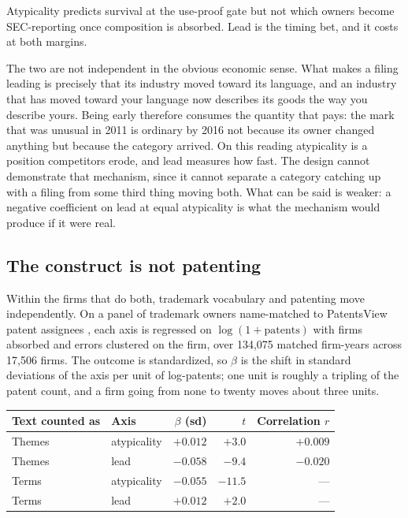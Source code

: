 \documentclass[11pt]{article}
\begin{document}
Atypicality predicts survival at the use-proof gate but not which owners become SEC-reporting once composition is
absorbed. Lead is the timing bet, and it costs at both margins.

The two are not independent in the obvious economic sense. What makes a
filing leading is precisely that its industry moved toward its language, and
an industry that has moved toward your language now describes its goods the
way you describe yours. Being early therefore consumes the quantity that
pays: the mark that was unusual in 2011 is ordinary by 2016 not because its
owner changed anything but because the category arrived. On this reading
atypicality is a position competitors erode, and lead measures how fast.
The design cannot demonstrate that mechanism, since it cannot separate a
category catching up with a filing from some third thing moving both. What can
be said is weaker: a negative coefficient on lead at equal atypicality is what
the mechanism would produce if it were real.

\subsection{The construct is not patenting}\label{sec:patent}

Within the firms that do both, trademark vocabulary and patenting move
independently. On a panel of trademark owners name-matched to PatentsView
patent assignees \citep{PatentsView}, each axis is regressed on
$\log(1 + \mathrm{patents})$ with firms absorbed and errors clustered on the
firm, over 134{,}075 matched firm-years across 17{,}506 firms. The outcome is
standardized, so $\beta$ is the shift in standard deviations of the axis per
unit of log-patents; one unit is roughly a tripling of the patent count, and a
firm going from none to twenty moves about three units.

\begin{center}\small
\begin{tabular}{llrrr}
\toprule
Text counted as & Axis & $\beta$ (sd) & $t$ & Correlation $r$ \\
\midrule
Themes & atypicality & $+0.012$ & $+3.0$ & $+0.009$ \\
Themes & lead        & $-0.058$ & $-9.4$ & $-0.020$ \\
Terms  & atypicality & $-0.055$ & $-11.5$ & --- \\
Terms  & lead        & $+0.012$ & $+2.0$ & --- \\
\bottomrule
\end{tabular}
\end{center}
\end{document}
